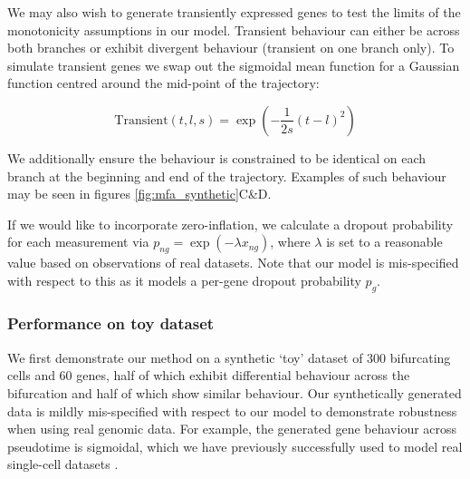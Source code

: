 We may also wish to generate transiently expressed genes to test the limits of the monotonicity assumptions in our model. Transient behaviour can either be across both branches or exhibit divergent behaviour (transient on one branch only). To simulate transient genes we swap out the sigmoidal mean function for a Gaussian function centred around the mid-point of the trajectory:

\begin{equation}
    \text{Transient}(t, l, s)  = \exp( - \frac{1}{2s} (t - l)^2 )
\end{equation}

We additionally ensure the behaviour is constrained to be identical on each branch at the beginning and end of the trajectory. Examples of such behaviour may be seen in figures \ref{fig:mfa_synthetic}C\&D.

If we would like to incorporate zero-inflation, we calculate a dropout probability for each measurement via $p_{ng} = \exp(-\lambda x_{ng})$, where $\lambda$ is set to a reasonable value based on observations of real datasets. Note that our model is mis-specified with respect to this as it models a per-gene dropout probability $p_g$.

\subsubsection{Performance on toy dataset}

We first demonstrate our method on a synthetic `toy' dataset of 300 bifurcating cells and 60 genes, half of which exhibit differential behaviour across the bifurcation and half of which show similar behaviour.
Our synthetically generated data is mildly mis-specified with respect to our model to demonstrate robustness when using real genomic data. For example, the generated gene behaviour across pseudotime is sigmoidal, which we have previously successfully used to model real single-cell datasets \cite{campbell2016order,campbell2016switchde}.

